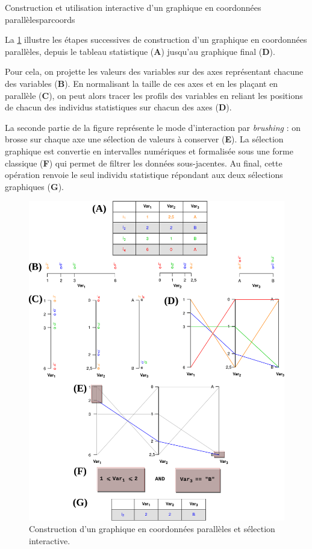 	\begin{encadre}{Construction et utilisation interactive d'un graphique en coordonnées parallèles}{parcoords}

	La \cref{fig:schema_parcoords} illustre les étapes successives de construction d'un graphique en coordonnées parallèles, depuis le tableau statistique (\textbf{A}) jusqu'au graphique final (\textbf{D}).
	
	Pour cela, on projette les valeurs des variables sur des axes représentant chacune des variables (\textbf{B}).
	En normalisant la taille de ces axes et en les plaçant en parallèle (\textbf{C}), on peut alors tracer les \og profils\fg{} des variables en reliant les positions de chacun des individus statistiques sur chacun des axes (\textbf{D}).
	
	La seconde partie de la figure représente le mode d'interaction par \textit{brushing} : on \og brosse\fg{} sur chaque axe une sélection de valeurs à conserver (\textbf{E}).
	La sélection graphique est convertie en intervalles numériques et formalisée sous une forme classique (\textbf{F}) qui permet de filtrer les données sous-jacentes.
	Au final, cette opération renvoie le seul individu statistique répondant aux deux sélections graphiques (\textbf{G}).
	
	\begin{figure}[H]
	\centering
	\captionsetup{width=\linewidth}
	\includegraphics[width=.94\linewidth]{img/ParCoords_Brush.pdf}
	\caption{Construction d'un graphique en coordonnées parallèles et sélection interactive.\vspace{.1cm}}
	\label{fig:schema_parcoords}
	\end{figure}

	\end{encadre}


